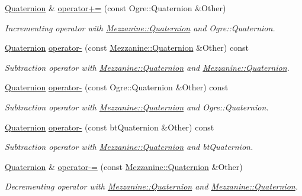 \begin{DoxyCompactItemize}
\hyperlink{classMezzanine_1_1Quaternion}{Quaternion} \& \hyperlink{classMezzanine_1_1Quaternion_a670eff2eac4268818738e2d10e81bc11}{operator+=} (const Ogre::Quaternion \&Other)
\begin{DoxyCompactList}\small\item\em Incrementing operator with \hyperlink{classMezzanine_1_1Quaternion}{Mezzanine::Quaternion} and Ogre::Quaternion. \item\end{DoxyCompactList}\item 
\hyperlink{classMezzanine_1_1Quaternion}{Quaternion} \hyperlink{classMezzanine_1_1Quaternion_a9ac4c2827e1f185dd804012b440c9677}{operator-\/} (const \hyperlink{classMezzanine_1_1Quaternion}{Mezzanine::Quaternion} \&Other) const 
\begin{DoxyCompactList}\small\item\em Subtraction operator with \hyperlink{classMezzanine_1_1Quaternion}{Mezzanine::Quaternion} and \hyperlink{classMezzanine_1_1Quaternion}{Mezzanine::Quaternion}. \item\end{DoxyCompactList}\item 
\hyperlink{classMezzanine_1_1Quaternion}{Quaternion} \hyperlink{classMezzanine_1_1Quaternion_a0bee32c0dc25971e4ec9ba614c2b1d6b}{operator-\/} (const Ogre::Quaternion \&Other) const 
\begin{DoxyCompactList}\small\item\em Subtraction operator with \hyperlink{classMezzanine_1_1Quaternion}{Mezzanine::Quaternion} and Ogre::Quaternion. \item\end{DoxyCompactList}\item 
\hyperlink{classMezzanine_1_1Quaternion}{Quaternion} \hyperlink{classMezzanine_1_1Quaternion_a914d4e0e7615d15ffae8d28a8b002eb9}{operator-\/} (const btQuaternion \&Other) const 
\begin{DoxyCompactList}\small\item\em Subtraction operator with \hyperlink{classMezzanine_1_1Quaternion}{Mezzanine::Quaternion} and btQuaternion. \item\end{DoxyCompactList}\item 
\hyperlink{classMezzanine_1_1Quaternion}{Quaternion} \& \hyperlink{classMezzanine_1_1Quaternion_a549fb71ffdaacb0ced2828dabfc7f444}{operator-\/=} (const \hyperlink{classMezzanine_1_1Quaternion}{Mezzanine::Quaternion} \&Other)
\begin{DoxyCompactList}\small\item\em Decrementing operator with \hyperlink{classMezzanine_1_1Quaternion}{Mezzanine::Quaternion} and \hyperlink{classMezzanine_1_1Quaternion}{Mezzanine::Quaternion}. \item\end{DoxyCompactList}\item 

\end{DoxyCompactItemize}
